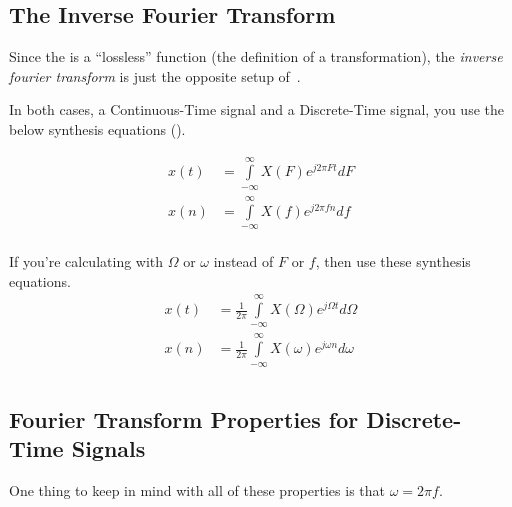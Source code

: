 \subsection{The Inverse Fourier Transform}\label{subsec:InverseFourierTransform}
\begin{definition}\label{def:InverseFourierTransform}
  Since the  is a ``lossless'' function (the definition of a transformation), the \emph{inverse fourier transform} is just the opposite setup of~.

  In both cases, a Continuous-Time signal and a Discrete-Time signal, you use the below synthesis equations ().
  
  \begin{equation}\label{eq:InverseFourierTransform-Frequency}
    \begin{aligned}
      x(t) &= \int\limits_{-\infty}^{\infty} X(F) e^{j 2\pi Ft} dF \\
      x(n) &= \int\limits_{-\infty}^{\infty} X(f) e^{j 2\pi fn} df \\
    \end{aligned}
  \end{equation}

  If you're calculating with $\Omega$ or $\omega$ instead of $F$ or $f$, then use these synthesis equations.
  \begin{equation}\label{eq:InverseFourierTransform-Omega}
    \begin{aligned}
      x(t) &= \frac{1}{2\pi} \int\limits_{-\infty}^{\infty} X(\Omega) e^{j \Omega t} d\Omega \\
      x(n) &= \frac{1}{2\pi} \int\limits_{-\infty}^{\infty} X(\omega) e^{j \omega n} d\omega \\
    \end{aligned}
  \end{equation}
\end{definition}

\subsection{Fourier Transform Properties for Discrete-Time Signals}\label{subsec:FourierTransformProperties-Discrete}
One thing to keep in mind with all of these properties is that $\omega = 2 \pi f$.

